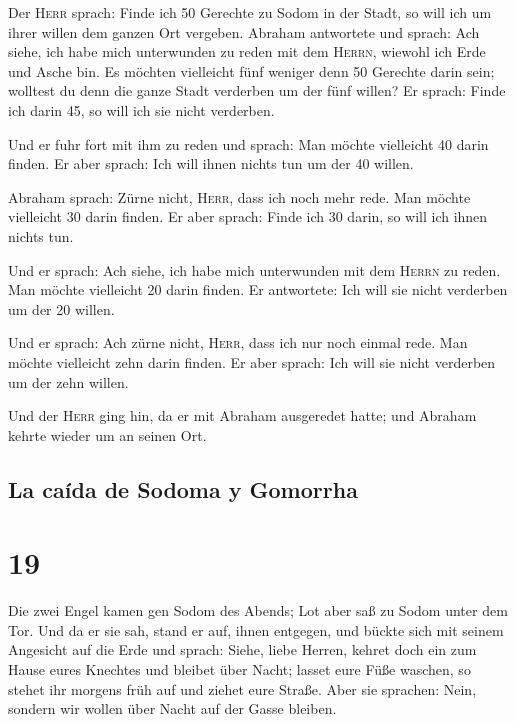  Der \textsc{Herr} sprach: Finde ich 50 Gerechte zu Sodom
in der Stadt, so will ich um ihrer willen dem ganzen Ort vergeben.
 Abraham antwortete und sprach: Ach siehe, ich habe mich
unterwunden zu reden mit dem \textsc{Herrn}, wiewohl ich Erde und Asche
bin.  Es möchten vielleicht fünf weniger denn 50 Gerechte
darin sein; wolltest du denn die ganze Stadt verderben um der fünf
willen? Er sprach: Finde ich darin 45, so will ich sie nicht verderben.

 Und er fuhr fort mit ihm zu reden und sprach: Man möchte
vielleicht 40 darin finden. Er aber sprach: Ich will ihnen nichts tun um
der 40 willen.

 Abraham sprach: Zürne nicht, \textsc{Herr}, dass ich
noch mehr rede. Man möchte vielleicht 30 darin finden. Er aber sprach:
Finde ich 30 darin, so will ich ihnen nichts tun.

 Und er sprach: Ach siehe, ich habe mich unterwunden mit
dem \textsc{Herrn} zu reden. Man möchte vielleicht 20 darin finden. Er
antwortete: Ich will sie nicht verderben um der 20 willen.

 Und er sprach: Ach zürne nicht, \textsc{Herr}, dass ich
nur noch einmal rede. Man möchte vielleicht zehn darin finden. Er aber
sprach: Ich will sie nicht verderben um der zehn willen.

 Und der \textsc{Herr} ging hin, da er mit Abraham
ausgeredet hatte; und Abraham kehrte wieder um an seinen Ort.

\hypertarget{la-cauxedda-de-sodoma-y-gomorrha}{%
\subsection{La caída de Sodoma y
Gomorrha}\label{la-cauxedda-de-sodoma-y-gomorrha}}

\hypertarget{section-18}{%
\section{19}\label{section-18}}

 Die zwei Engel kamen gen Sodom des Abends; Lot aber saß
zu Sodom unter dem Tor. Und da er sie sah, stand er auf, ihnen entgegen,
und bückte sich mit seinem Angesicht auf die Erde  und
sprach: Siehe, liebe Herren, kehret doch ein zum Hause eures Knechtes
und bleibet über Nacht; lasset eure Füße waschen, so stehet ihr morgens
früh auf und ziehet eure Straße. Aber sie sprachen: Nein, sondern wir
wollen über Nacht auf der Gasse bleiben.


